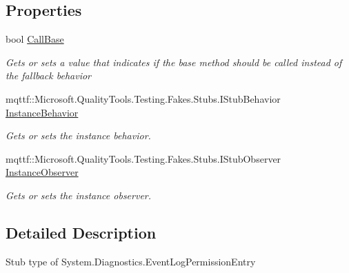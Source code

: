 \subsection*{Properties}
\begin{DoxyCompactItemize}
\item 
bool \hyperlink{class_system_1_1_diagnostics_1_1_fakes_1_1_stub_event_log_permission_entry_a60967dfef49f9ea62b396494dc221b01}{Call\-Base}
\begin{DoxyCompactList}\small\item\em Gets or sets a value that indicates if the base method should be called instead of the fallback behavior\end{DoxyCompactList}\item 
mqttf\-::\-Microsoft.\-Quality\-Tools.\-Testing.\-Fakes.\-Stubs.\-I\-Stub\-Behavior \hyperlink{class_system_1_1_diagnostics_1_1_fakes_1_1_stub_event_log_permission_entry_a0d1435320e4264ed2925d30ad1ef5e06}{Instance\-Behavior}
\begin{DoxyCompactList}\small\item\em Gets or sets the instance behavior.\end{DoxyCompactList}\item 
mqttf\-::\-Microsoft.\-Quality\-Tools.\-Testing.\-Fakes.\-Stubs.\-I\-Stub\-Observer \hyperlink{class_system_1_1_diagnostics_1_1_fakes_1_1_stub_event_log_permission_entry_a87aabc17b380ea1b4c64dc7d8038b4a3}{Instance\-Observer}
\begin{DoxyCompactList}\small\item\em Gets or sets the instance observer.\end{DoxyCompactList}\end{DoxyCompactItemize}


\subsection{Detailed Description}
Stub type of System.\-Diagnostics.\-Event\-Log\-Permission\-Entry



